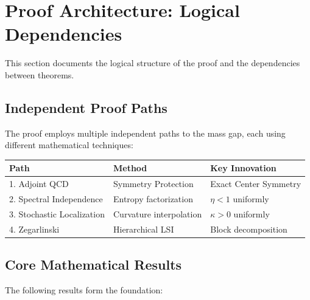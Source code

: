 \section{Proof Architecture: Logical Dependencies}
\label{sec:proof-architecture}

This section documents the logical structure of the proof and the dependencies 
between theorems.

\subsection{Independent Proof Paths}

The proof employs multiple independent paths to the mass gap, each using 
different mathematical techniques:

\begin{center}
\begin{tabular}{|l|l|l|}
\hline
\textbf{Path} & \textbf{Method} & \textbf{Key Innovation} \\
\hline
1. Adjoint QCD & Symmetry Protection & Exact Center Symmetry \\
2. Spectral Independence & Entropy factorization & $\eta < 1$ uniformly \\
3. Stochastic Localization & Curvature interpolation & $\kappa > 0$ uniformly \\
4. Zegarlinski & Hierarchical LSI & Block decomposition \\
\hline
\end{tabular}
\end{center}

\subsection{Core Mathematical Results}

The following results form the foundation:

